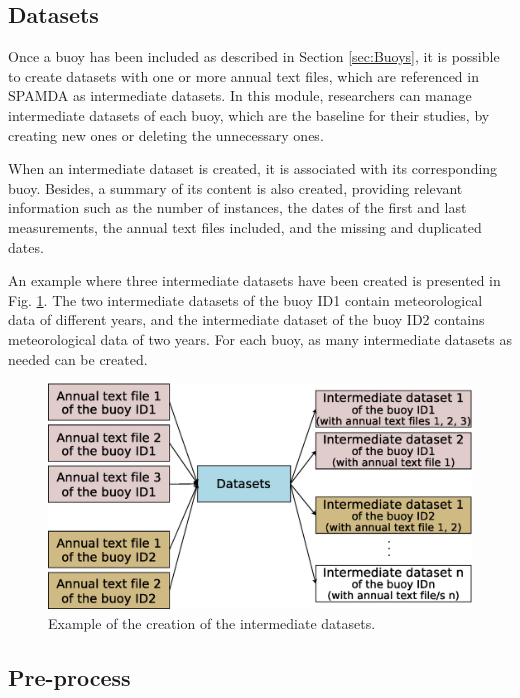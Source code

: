 \documentclass[energies,article,submit,moreauthors,pdftex]{Definitions/mdpi}
\begin{document}
			\subsection{Datasets}\label{sec:Datasets}
			
				Once a buoy has been included as described in Section \ref{sec:Buoys}, it is possible to create datasets with one or more annual text files, which are referenced in SPAMDA as intermediate datasets. In this module, researchers can manage intermediate datasets of each buoy, which are the baseline for their studies, by creating new ones or deleting the unnecessary ones.
				
				When an intermediate dataset is created, it is associated with its corresponding buoy. Besides, a summary of its content is also created, providing relevant information such as the number of instances, the dates of the first and last measurements, the annual text files included, and the missing and duplicated dates.
				
				An example where three intermediate datasets have been created is presented in Fig. \ref{fig:datasets}. The two intermediate datasets of the buoy ID1 contain meteorological data of different years, and the intermediate dataset of the buoy ID2 contains meteorological data of two years. For each buoy, as many intermediate datasets as needed can be created.
				
				\begin{figure}[ht!]
					\centering
					\includegraphics[scale=0.40]{figures/FigureDatasets.eps}
					\caption{Example of the creation of the intermediate datasets.}
					\label{fig:datasets}
				\end{figure}
				
				
			\subsection{Pre-process} \label{sec:Preprocess}
				
\end{document}

